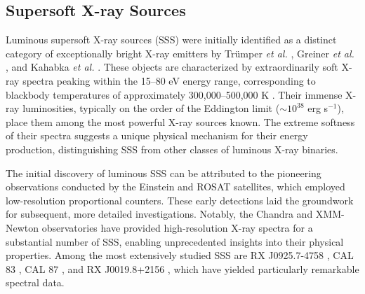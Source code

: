         \subsection{Supersoft X-ray Sources} \label{introduction:introduction:sss}
        	Luminous supersoft X-ray sources (SSS) were initially identified as a distinct category of exceptionally bright X-ray emitters by Tr{\"u}mper \emph{et al.} \cite{trumper91}, Greiner \emph{et al.} \cite{greiner91}, and Kahabka \emph{et al.} \cite{kahabka06}. These objects are characterized by extraordinarily soft X-ray spectra peaking within the 15--80 eV energy range, corresponding to blackbody temperatures of approximately 300,000--500,000 K \cite{kahabka06}. Their immense X-ray luminosities, typically on the order of the Eddington limit ($\sim 10^{38}$ erg s$^{-1}$), place them among the most powerful X-ray sources known. The extreme softness of their spectra suggests a unique physical mechanism for their energy production, distinguishing SSS from other classes of luminous X-ray binaries.
        	
        	The initial discovery of luminous SSS can be attributed to the pioneering observations conducted by the Einstein and ROSAT satellites, which employed low-resolution proportional counters. These early detections laid the groundwork for subsequent, more detailed investigations. Notably, the Chandra and XMM-Newton observatories have provided high-resolution X-ray spectra for a substantial number of SSS, enabling unprecedented insights into their physical properties. Among the most extensively studied SSS are RX J0925.7-4758 \cite{bearda2002,motch2002}, CAL 83 \cite{lanz2005}, CAL 87 \cite{orio2004}, and RX J0019.8+2156 \cite{schwarz2004}, which have yielded particularly remarkable spectral data.
        	
